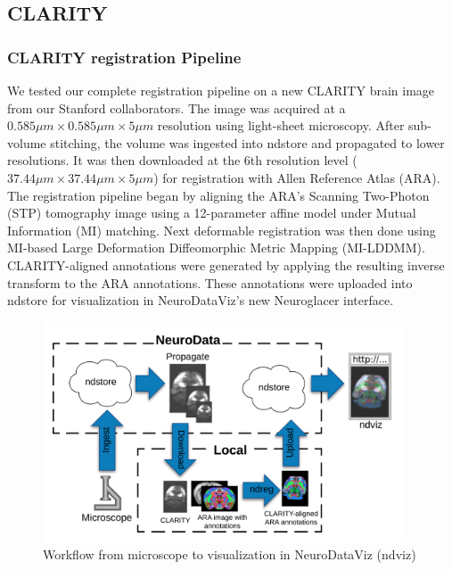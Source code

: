 \documentclass[simplex.tex]{subfiles}
\begin{document}
\subsection{CLARITY}

\subsubsection{CLARITY registration Pipeline}

We tested our complete registration pipeline on a new CLARITY brain image from our Stanford collaborators.
The image was acquired at a $0.585 \mu m \times 0.585 \mu m \times 5 \mu m$ resolution using light-sheet microscopy.
After sub-volume stitching, the volume was ingested into ndstore and propagated to lower resolutions.
It was then downloaded at the 6th resolution level ($37.44 \mu m \times 37.44 \mu m \times 5 \mu m$) for registration with Allen Reference Atlas (ARA).
The registration pipeline began by aligning the ARA's Scanning Two-Photon (STP) tomography image using a 12-parameter affine model under Mutual Information (MI) matching.
Next deformable registration was then done using MI-based Large Deformation Diffeomorphic Metric Mapping (MI-LDDMM).
CLARITY-aligned annotations were generated by applying the resulting inverse transform to the ARA annotations.
These annotations were uploaded into ndstore for visualization in NeuroDataViz's new Neuroglacer interface.

\begin{figure}[!h]
\begin{cframed}
\centering
\includegraphics[width=0.95\textwidth]{../../figs/workflow.png}
\caption{Workflow from microscope to visualization in NeuroDataViz (ndviz)}
\label{fig:name}
\end{cframed}
\end{figure}
\end{document}
